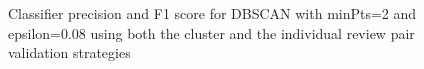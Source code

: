 \begin{figure}[ht]
\begin{center}
{\label{fig:subfig3}}
\caption{Classifier precision and F1 score for DBSCAN with minPts=2 and epsilon=0.08 using both the cluster and the individual review pair validation strategies}    
\label{dbscan-minpts-2-eps-0-08}
\end{center}
\end{figure}

